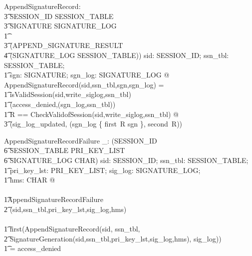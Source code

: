 \documentclass[a4paper,pdftex]{article}
\begin{document}
\begin{axdef}
AppendSignatureRecord: \\
\t3 SESSION\_ID \cross SESSION\_TABLE \cross \\
\t3 SIGNATURE \cross  SIGNATURE\_LOG \\
\t1 \fun \\
\t3 (APPEND\_SIGNATURE\_RESULT \cross \\
\t4    (SIGNATURE\_LOG \cross SESSION\_TABLE))
\where
\forall sid: SESSION\_ID; ssn\_tbl: SESSION\_TABLE; \\
\t1 sgn: SIGNATURE; sgn\_log: SIGNATURE\_LOG @ \\
AppendSignatureRecord(sid,ssn\_tbl,sgn,sgn\_log) = \\
\t1 \IF \lnot isValidSession(sid,write\_siglog,ssn\_tbl) \\
\t1 \THEN (access\_denied,(sgn\_log,ssn\_tbl)) \\
\t1 \ELSE \LET R == CheckValidofSession(sid,write\_siglog,ssn\_tbl) @ \\
\t3        (sig\_log\_updated, (sgn\_log \oplus \{ first~R \mapsto sgn \}, second~R))
\end{axdef}


\begin{axdef}
AppendSignatureRecordFailure \_: \power (SESSION\_ID \\
\t6 \cross SESSION\_TABLE \cross PRI\_KEY\_LIST \\
\t6 \cross SIGNATURE\_LOG \cross \seq CHAR)
\where
\forall sid: SESSION\_ID; ssn\_tbl: SESSION\_TABLE; \\
\t1 pri\_key\_lst: PRI\_KEY\_LIST; sig\_log: SIGNATURE\_LOG; \\
\t1 hms: \seq CHAR @ \\
\\
\t1AppendSignatureRecordFailure\\
\t2    (sid,ssn\_tbl,pri\_key\_lst,sig\_log,hms)\\
 \iff \\
\t1 first(AppendSignatureRecord(sid, ssn\_tbl, \\
\t2     SignatureGeneration(sid,ssn\_tbl,pri\_key\_lst,sig\_log,hms), sig\_log)) \\
\t1   = access\_denied 
\end{axdef}
\end{document}
